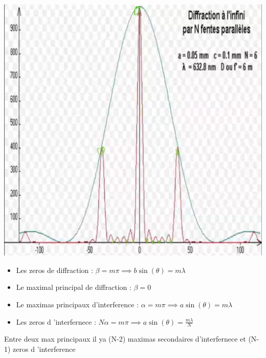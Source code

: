 \documentclass[12pt]{book}
\begin{document}
                \begin{center}
                    \begin{minipage}{0.49\linewidth}
                        \includegraphics[width=\linewidth]{pic/interferencediffractionN.png}
                    \end{minipage}
                    \begin{minipage}{0.49\linewidth}
                        \begin{itemize}
                            \item Les zeros de diffraction : $\beta = m\pi \implies b\sin(\theta)=m\lambda$
                            \item Le maximal principal de diffraction : $\beta = 0$
                            \item Le maximas principaux d'interference : $\alpha =m\pi \implies a\sin(\theta)=m\lambda $
                            \item Les zeros d 'interfernece : $N\alpha = m\pi \implies a\sin(\theta) = \frac{m\lambda}{N}$
                        \end{itemize}
                        Entre deux max principaux il ya (N-2) maximas secondaires d'interfernece et (N-1) zeros d 'interference
                    \end{minipage}
                \end{center}
            
\end{document}
